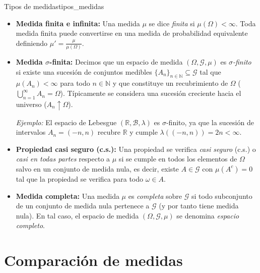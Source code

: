\begin{definicion}{Tipos de medidas}{tipos_medidas}
    \begin{itemize}
        \item \textbf{Medida finita e infinita:} Una medida $\mu$ se dice \textit{finita} si $\mu(\Omega) < \infty$. Toda medida finita puede convertirse en una medida de probabilidad equivalente definiendo $\mu' = \frac{\mu}{\mu(\Omega)}$.
        \item \textbf{Medida $\sigma$-finita:} Decimos que un espacio de medida $(\Omega, \mathcal{G}, \mu)$ es \textit{$\sigma$-finito} si existe una sucesión de conjuntos medibles $\{A_n\}_{n \in \mathbb{N}} \subseteq \mathcal{G}$ tal que $\mu(A_n) < \infty$ para todo $n \in \mathbb{N}$ y que constituye un recubrimiento de $\Omega$ ($\bigcup_{n=1}^\infty A_n = \Omega$). Típicamente se considera una sucesión creciente hacia el universo ($A_n \uparrow \Omega$).
        
        \textit{Ejemplo:} El espacio de Lebesgue $(\mathbb{R}, \mathcal{B}, \lambda)$ es $\sigma$-finito, ya que la sucesión de intervalos $A_n = (-n, n)$ recubre $\mathbb{R}$ y cumple $\lambda((-n, n)) = 2n < \infty$.
        
        \item \textbf{Propiedad casi seguro (c.s.):} Una propiedad se verifica \textit{casi seguro} (c.s.) o \textit{casi en todas partes} respecto a $\mu$ si se cumple en todos los elementos de $\Omega$ salvo en un conjunto de medida nula, es decir, existe $A \in \mathcal{G}$ con $\mu(A^c) = 0$ tal que la propiedad se verifica para todo $\omega \in A$.
        
        \item \textbf{Medida completa:} Una medida $\mu$ es \textit{completa} sobre $\mathcal{G}$ si todo subconjunto de un conjunto de medida nula pertenece a $\mathcal{G}$ (y por tanto tiene medida nula). En tal caso, el espacio de medida $(\Omega, \mathcal{G}, \mu)$ se denomina \textit{espacio completo}.
    \end{itemize}
\end{definicion}

\newpage
\section{Comparación de medidas}

